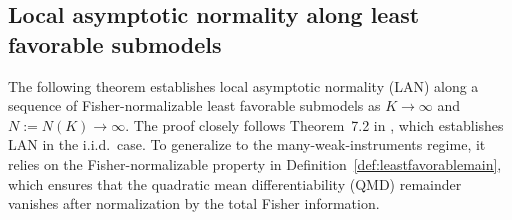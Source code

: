 \documentclass[11pt]{article}
\theoremstyle{plain}
\theoremstyle{definition}
\theoremstyle{remark}
\theoremstyle{definition}
\begin{document}
 


\subsection{Local asymptotic normality along least favorable submodels}

The following theorem establishes local asymptotic normality (LAN) along a sequence of Fisher-normalizable least favorable submodels as \( K \to \infty \) and \( N := N(K) \to \infty \). The proof closely follows Theorem~7.2 in \citet{van2000asymptotic}, which establishes LAN in the i.i.d.\ case. To generalize to the many-weak-instruments regime, it relies on the Fisher-normalizable property in Definition~\ref{def:leastfavorablemain}, which ensures that the quadratic mean differentiability (QMD) remainder vanishes after normalization by the total Fisher information.

 

 
\end{document}
